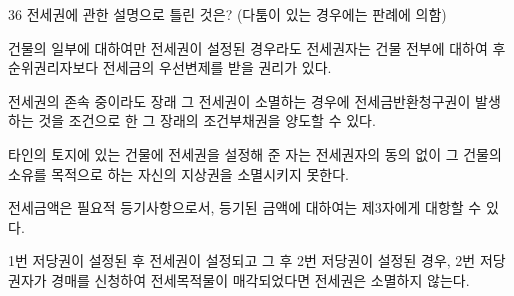 \begin{question}{36}
전세권에 관한 설명으로 틀린 것은? (다툼이 있는 경우에는 판례에 의함)
\begin{choices}
  \item 건물의 일부에 대하여만 전세권이 설정된 경우라도 전세권자는 건물 전부에 대하여 후순위권리자보다 전세금의 우선변제를 받을 권리가 있다.
  \item 전세권의 존속 중이라도 장래 그 전세권이 소멸하는 경우에 전세금반환청구권이 발생하는 것을 조건으로 한 그 장래의 조건부채권을 양도할 수 있다.
  \item 타인의 토지에 있는 건물에 전세권을 설정해 준 자는 전세권자의 동의 없이 그 건물의 소유를 목적으로 하는 자신의 지상권을 소멸시키지 못한다.
  \item 전세금액은 필요적 등기사항으로서, 등기된 금액에 대하여는 제3자에게 대항할 수 있다.
  \item 1번 저당권이 설정된 후 전세권이 설정되고 그 후 2번 저당권이 설정된 경우, 2번 저당권자가 경매를 신청하여 전세목적물이 매각되었다면 전세권은 소멸하지 않는다.
\end{choices}
\end{question}
